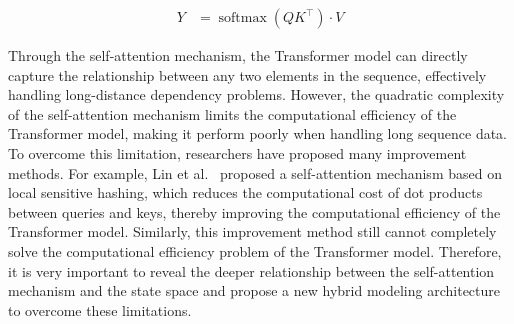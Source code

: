 \documentclass{article}
\theoremstyle{plain}
\theoremstyle{definition}
\theoremstyle{remark}
\begin{document}
\begin{equation}
   \begin{aligned}
      Y &= \operatorname*{softmax}({QK^\top}) \cdot V   
   \end{aligned}
\label{eq:self_attention}
\end{equation}

Through the self-attention mechanism, the Transformer model can directly capture the relationship between any two elements in the sequence, effectively handling long-distance dependency problems. However, the quadratic complexity of the self-attention mechanism limits the computational efficiency of the Transformer model, making it perform poorly when handling long sequence data. To overcome this limitation, researchers have proposed many improvement methods. For example, Lin et al.~\cite{kitaev2020reformer} proposed a self-attention mechanism based on local sensitive hashing, which reduces the computational cost of dot products between queries and keys, thereby improving the computational efficiency of the Transformer model. Similarly, this improvement method still cannot completely solve the computational efficiency problem of the Transformer model. Therefore, it is very important to reveal the deeper relationship between the self-attention mechanism and the state space and propose a new hybrid modeling architecture to overcome these limitations.
\end{document}
